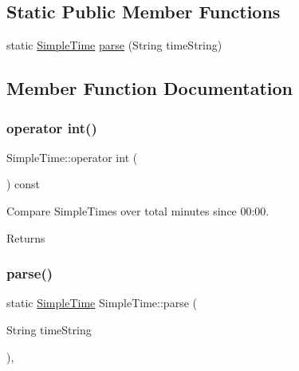 \subsection*{Static Public Member Functions}
\begin{DoxyCompactItemize}
\item 
static \mbox{\hyperlink{class_simple_time}{Simple\+Time}} \mbox{\hyperlink{class_simple_time_ad2d133f20de1ac63166308bc77906dfb}{parse}} (String time\+String)
\end{DoxyCompactItemize}


\subsection{Member Function Documentation}
\mbox{\label{class_simple_time_a9d034d06249024ed0366c99029243168}} 
\subsubsection{\texorpdfstring{operator int()}{operator int()}}
{\footnotesize\ttfamily Simple\+Time\+::operator int (\begin{DoxyParamCaption}{ }\end{DoxyParamCaption}) const\hspace{0.3cm}{\ttfamily [inline]}}

Compare Simple\+Times over total minutes since 00\+:00. \begin{DoxyReturn}{Returns}

\end{DoxyReturn}
\mbox{\label{class_simple_time_ad2d133f20de1ac63166308bc77906dfb}} 
\subsubsection{\texorpdfstring{parse()}{parse()}}
{\footnotesize\ttfamily static \mbox{\hyperlink{class_simple_time}{Simple\+Time}} Simple\+Time\+::parse (\begin{DoxyParamCaption}\item[{String}]{time\+String }\end{DoxyParamCaption})\hspace{0.3cm}{\ttfamily [inline]}, {\ttfamily [static]}}


